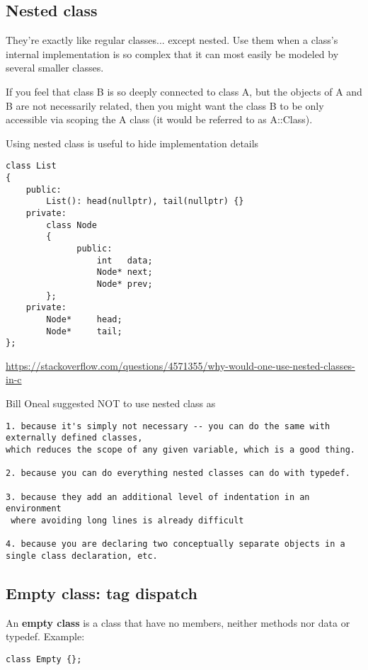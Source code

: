 \subsection{Nested class}
\label{sec:nested-class}

They're exactly like regular classes... except nested.
Use them when a class's internal implementation is so complex that it can most
easily be modeled by several smaller classes.

If you feel that class B is so deeply connected to class A, but the objects of A
and B are not necessarily related, then you might want the class B to be only
accessible via scoping the A class (it would be referred to as A::Class).

Using nested class is useful to hide implementation details
\begin{lstlisting}
class List
{
    public:
        List(): head(nullptr), tail(nullptr) {}
    private:
        class Node
        {
              public:
                  int   data;
                  Node* next;
                  Node* prev;
        };
    private:
        Node*     head;
        Node*     tail;
};
\end{lstlisting}
\url{https://stackoverflow.com/questions/4571355/why-would-one-use-nested-classes-in-c}

Bill Oneal suggested NOT to use nested class as
\begin{verbatim}
1. because it's simply not necessary -- you can do the same with externally defined classes, 
which reduces the scope of any given variable, which is a good thing. 

2. because you can do everything nested classes can do with typedef. 

3. because they add an additional level of indentation in an environment
 where avoiding long lines is already difficult 
 
4. because you are declaring two conceptually separate objects in a single class declaration, etc. 
\end{verbatim}


\subsection{Empty class: tag dispatch}
\label{sec:empty-class-C++}
\label{sec:tag-dispatch-C++}

An {\bf empty class} is a class that have no members, neither methods nor data or typedef.
Example:
\begin{verbatim}
class Empty {};
\end{verbatim}

